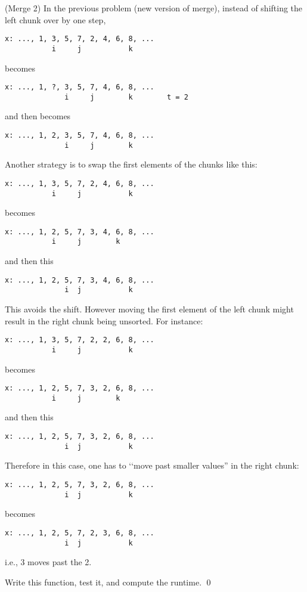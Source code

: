 \begin{ex} (Merge 2)
In the previous problem (new version of merge), instead of shifting the
left chunk over by one step, 
\begin{Verbatim}[frame=single,fontsize=\footnotesize]
x: ..., 1, 3, 5, 7, 2, 4, 6, 8, ...
           i     j           k
\end{Verbatim}
becomes
\begin{Verbatim}[frame=single,fontsize=\footnotesize]
x: ..., 1, ?, 3, 5, 7, 4, 6, 8, ...
              i     j        k        t = 2
\end{Verbatim}
and then becomes
\begin{Verbatim}[frame=single,fontsize=\footnotesize]
x: ..., 1, 2, 3, 5, 7, 4, 6, 8, ...
              i     j        k       
\end{Verbatim}
Another strategy is to swap the first elements of the chunks like this:
\begin{Verbatim}[frame=single,fontsize=\footnotesize]
x: ..., 1, 3, 5, 7, 2, 4, 6, 8, ...
           i     j           k
\end{Verbatim}
becomes
\begin{Verbatim}[frame=single,fontsize=\footnotesize]
x: ..., 1, 2, 5, 7, 3, 4, 6, 8, ...
           i     j        k        
\end{Verbatim}
and then this
\begin{Verbatim}[frame=single,fontsize=\footnotesize]
x: ..., 1, 2, 5, 7, 3, 4, 6, 8, ...
              i  j           k       
\end{Verbatim}
This avoids the shift.
However moving the first element of the left chunk 
might result in the right chunk being unsorted.
For instance:
\begin{Verbatim}[frame=single,fontsize=\footnotesize]
x: ..., 1, 3, 5, 7, 2, 2, 6, 8, ...
           i     j           k
\end{Verbatim}
becomes
\begin{Verbatim}[frame=single,fontsize=\footnotesize]
x: ..., 1, 2, 5, 7, 3, 2, 6, 8, ...
           i     j        k        
\end{Verbatim}
and then this
\begin{Verbatim}[frame=single,fontsize=\footnotesize]
x: ..., 1, 2, 5, 7, 3, 2, 6, 8, ...
              i  j           k       
\end{Verbatim}
Therefore in this case, one has to \lq\lq move past
smaller values'' in the right chunk:
\begin{Verbatim}[frame=single,fontsize=\footnotesize]
x: ..., 1, 2, 5, 7, 3, 2, 6, 8, ...
              i  j           k       
\end{Verbatim}
becomes
\begin{Verbatim}[frame=single,fontsize=\footnotesize]
x: ..., 1, 2, 5, 7, 2, 3, 6, 8, ...
              i  j           k       
\end{Verbatim}
i.e., $3$ moves past the 2.

Write this function, test it, and compute the runtime.
\qed
\end{ex}

